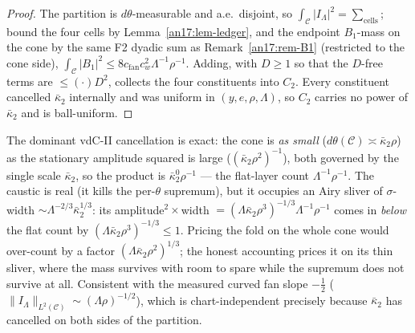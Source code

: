 \begin{proof}
The partition is $d\theta$-measurable and a.e.\ disjoint, so
$\int_{\mathcal C}|I_\Lambda|^2=\sum_{\text{cells}}$; bound the four cells by
Lemma~\ref{an17:lem-ledger}, and the endpoint $B_1$-mass on the cone by the same
F2 dyadic sum as Remark~\ref{an17:rem-B1} (restricted to the cone side),
$\int_{\mathcal C}|B_1|^2\le8c_{\mathrm{fan}}c_w^2\Lambda^{-1}\rho^{-1}$. Adding,
with $D\ge1$ so that the $D$-free terms are $\le(\cdot)D^2$, collects the four
constituents into $C_2$. Every constituent cancelled $\bar\kappa_2$ internally and
was uniform in $(y,e,\rho,\Lambda)$, so $C_2$ carries no power of $\bar\kappa_2$
and is ball-uniform.
\end{proof}

\begin{remark}\label{an17:rem-cancel}
The dominant vdC-II cancellation is exact: the cone is \emph{as small}
($d\theta(\mathcal C)\asymp\bar\kappa_2\rho$) as the stationary amplitude squared
is large ($(\bar\kappa_2\rho^2)^{-1}$), both governed by the single scale
$\bar\kappa_2$, so the product is $\bar\kappa_2^0\rho^{-1}$ --- the flat-layer
count $\Lambda^{-1}\rho^{-1}$. The caustic is real (it kills the per-$\theta$
supremum), but it occupies an Airy sliver of $\sigma$-width $\sim\Lambda^{-2/3}
\bar\kappa_2^{1/3}$: its amplitude$^2\times$width $=(\Lambda\bar\kappa_2\rho^3)^{
-1/3}\Lambda^{-1}\rho^{-1}$ comes in \emph{below} the flat count by
$(\Lambda\bar\kappa_2\rho^3)^{-1/3}\le1$. Pricing the fold on the whole cone would
over-count by a factor $(\Lambda\bar\kappa_2\rho^2)^{1/3}$; the honest accounting
prices it on its thin sliver, where the mass survives with room to spare while the
supremum does not survive at all. Consistent with the measured curved fan slope
$-\tfrac12$ ($\|I_\Lambda\|_{L^2(\mathcal C)}\sim(\Lambda\rho)^{-1/2}$), which is
chart-independent precisely because $\bar\kappa_2$ has cancelled on both sides of
the partition.
\end{remark}

